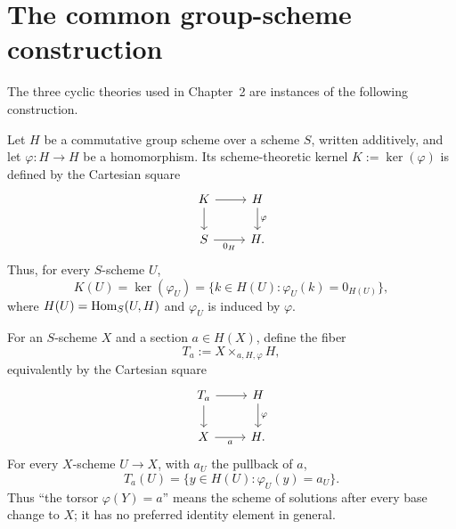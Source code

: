 \section{The common group-scheme construction}
\label{appendix:common_group_scheme_construction}

The three cyclic theories used in Chapter~2 are instances of the following
construction.

Let $H$ be a commutative group scheme over a scheme $S$, written additively,
and let $\varphi:H\to H$ be a homomorphism. Its scheme-theoretic kernel
$K:=\ker(\varphi)$ is defined by the Cartesian square
\begin{equation}\label{eq:kernel_square}
\begin{tikzcd}
K \arrow[r] \arrow[d] & H \arrow[d,"\varphi"] \\
S \arrow[r,"0_H"'] & H.
\end{tikzcd}
\end{equation}
Thus, for every $S$-scheme $U$,
\begin{equation}\label{eq:kernel_on_U_valued_points}
K(U)=\ker(\varphi_U)
    =\{k\in H(U):\varphi_U(k)=0_{H(U)}\},
\end{equation}
where $H(U)=\operatorname{Hom}_S(U,H)$ and $\varphi_U$ is induced by $\varphi$.

For an $S$-scheme $X$ and a section $a\in H(X)$, define the fiber
\begin{equation}\label{eq:fiber_torsor_definition}
T_a:=X\times_{a,H,\varphi}H,
\end{equation}
equivalently by the Cartesian square
\[
\begin{tikzcd}
T_a \arrow[r] \arrow[d] & H \arrow[d,"\varphi"] \\
X \arrow[r,"a"'] & H.
\end{tikzcd}
\]
For every $X$-scheme $U\to X$, with $a_U$ the pullback of $a$,
\[
T_a(U)=\{y\in H(U):\varphi_U(y)=a_U\}.
\]
Thus ``the torsor $\varphi(Y)=a$'' means the scheme of solutions after every
base change to $X$; it has no preferred identity element in general.

